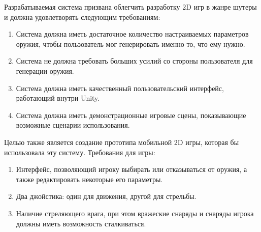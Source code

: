 Разрабатываемая система призвана облегчить разработку 2D игр в жанре шутеры и должна удовлетворять следующим требованиям:
\begin{enumerate}
    \item Система должна иметь достаточное количество настраиваемых параметров оружия, чтобы пользователь мог генерировать именно то, что ему нужно.
    \item Система не должна требовать больших усилий со стороны пользователя для генерации оружия.
    \item Система должна иметь качественный пользовательский интерфейс, работающий внутри Unity.
    \item Система должна иметь демонстрационные игровые сцены, показывающие возможные сценарии использования.
\end{enumerate}

\vspace{5mm}

Целью также является создание прототипа мобильной 2D игры, которая бы использовала эту систему. Требования для игры:
\begin{enumerate}
    \item Интерфейс, позволяющий игроку выбирать или отказываться от оружия, а также редактировать некоторые его параметры.
    \item Два джойстика: один для движения, другой для стрельбы.
    \item Наличие стреляющего врага, при этом вражеские снаряды и снаряды игрока должны иметь возможность сталкиваться.
\end{enumerate}

\pagebreak



